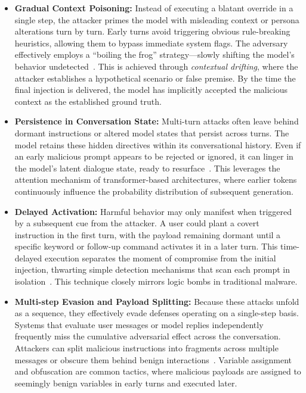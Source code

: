 \documentclass[conference]{IEEEtran}
\begin{document}
\begin{itemize}
    \item \textbf{Gradual Context Poisoning:} Instead of executing a blatant override in a single step, the attacker primes the model with misleading context or persona alterations turn by turn. Early turns avoid triggering obvious rule-breaking heuristics, allowing them to bypass immediate system flags. The adversary effectively employs a ``boiling the frog'' strategy---slowly shifting the model's behavior undetected~\cite{weng2025}. This is achieved through \textit{contextual drifting}, where the attacker establishes a hypothetical scenario or false premise. By the time the final injection is delivered, the model has implicitly accepted the malicious context as the established ground truth.

    \item \textbf{Persistence in Conversation State:} Multi-turn attacks often leave behind dormant instructions or altered model states that persist across turns. The model retains these hidden directives within its conversational history. Even if an early malicious prompt appears to be rejected or ignored, it can linger in the model's latent dialogue state, ready to resurface~\cite{feng2024}. This leverages the attention mechanism of transformer-based architectures, where earlier tokens continuously influence the probability distribution of subsequent generation.

    \item \textbf{Delayed Activation:} Harmful behavior may only manifest when triggered by a subsequent cue from the attacker. A user could plant a covert instruction in the first turn, with the payload remaining dormant until a specific keyword or follow-up command activates it in a later turn. This time-delayed execution separates the moment of compromise from the initial injection, thwarting simple detection mechanisms that scan each prompt in isolation~\cite{ha2025}. This technique closely mirrors logic bombs in traditional malware.

    \item \textbf{Multi-step Evasion and Payload Splitting:} Because these attacks unfold as a sequence, they effectively evade defenses operating on a single-step basis. Systems that evaluate user messages or model replies independently frequently miss the cumulative adversarial effect across the conversation. Attackers can split malicious instructions into fragments across multiple messages or obscure them behind benign interactions~\cite{wang2024}. Variable assignment and obfuscation are common tactics, where malicious payloads are assigned to seemingly benign variables in early turns and executed later.


\end{itemize}
\end{document}
